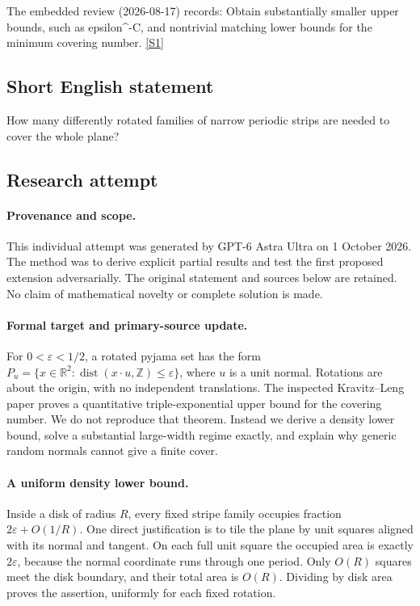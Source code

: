 \documentclass[11pt,a4paper]{article}
\newcommand{\Z}{\mathbb{Z}}
\newcommand{\R}{\mathbb{R}}
\newcommand{\sref}[2]{\hyperlink{source:#1:#2}{[S#2]}}
\begin{document}
The embedded review (2026-08-17) records: Obtain substantially smaller upper bounds, such as epsilon\textasciicircum{}{-C}, and nontrivial matching lower bounds for the minimum covering number. \sref{statement}{1}

\subsection{Short English statement}

How many differently rotated families of narrow periodic strips are needed to cover the whole plane?

\subsection{Research attempt}

\paragraph{Provenance and scope.}
This individual attempt was generated by GPT-6 Astra Ultra on 1 October 2026. The method was to derive explicit partial results and test the first proposed extension adversarially. The original statement and sources below are retained. No claim of mathematical novelty or complete solution is made.

\paragraph{Formal target and primary-source update.}
For $0<\varepsilon<1/2$, a rotated pyjama set has the form $P_u=\{x\in\R^2:\operatorname{dist}(x\cdot u,\Z)\leq\varepsilon\}$, where $u$ is a unit normal. Rotations are about the origin, with no independent translations. The inspected Kravitz--Leng paper proves a quantitative triple-exponential upper bound for the covering number. We do not reproduce that theorem. Instead we derive a density lower bound, solve a substantial large-width regime exactly, and explain why generic random normals cannot give a finite cover.

\paragraph{A uniform density lower bound.}
Inside a disk of radius $R$, every fixed stripe family occupies fraction $2\varepsilon+O(1/R)$. One direct justification is to tile the plane by unit squares aligned with its normal and tangent. On each full unit square the occupied area is exactly $2\varepsilon$, because the normal coordinate runs through one period. Only $O(R)$ squares meet the disk boundary, and their total area is $O(R)$. Dividing by disk area proves the assertion, uniformly for each fixed rotation.
\end{document}
